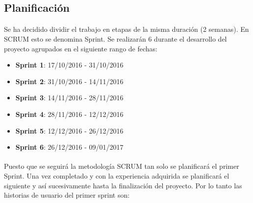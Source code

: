 \documentclass{article}
\begin{document}
       	\subsection{Planificación}

            \paragraph{}
			Se ha decidido dividir el trabajo en etapas de la misma duración (2 semanas). En SCRUM esto se denomina Sprint. Se realizarán 6 durante el desarrollo del proyecto agrupados en el siguiente rango de fechas:
            
            \begin{itemize}
            	\item \textbf{Sprint 1}: 17/10/2016 - 31/10/2016 

            	\item \textbf{Sprint 2}: 31/10/2016 - 14/11/2016

            	\item \textbf{Sprint 3}: 14/11/2016 - 28/11/2016

            	\item \textbf{Sprint 4}: 28/11/2016 - 12/12/2016

            	\item \textbf{Sprint 5}: 12/12/2016 - 26/12/2016

            	\item \textbf{Sprint 6}: 26/12/2016 - 09/01/2017

            \end{itemize}
			
            \paragraph{}
			Puesto que se seguirá la metodología SCRUM tan solo se planificará el primer Sprint. Una vez completado y con la experiencia adquirida se planificará el siguiente y así sucesivamente hasta la finalización del proyecto. Por lo tanto las historias de usuario del primer sprint son:
            
\end{document}
